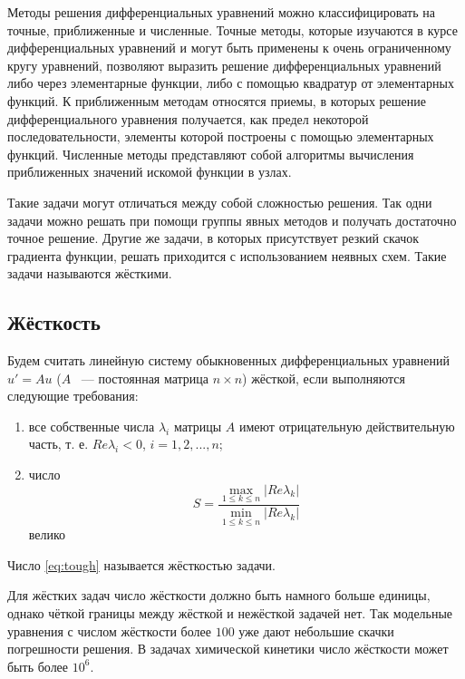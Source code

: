 Методы решения дифференциальных уравнений можно классифицировать на точные, приближенные и численные. Точные методы, которые изучаются
в курсе дифференциальных уравнений и могут быть применены к очень ограниченному кругу уравнений, позволяют выразить решение
дифференциальных уравнений либо через элементарные функции, либо с помощью квадратур от элементарных функций. К приближенным методам
относятся приемы, в которых решение дифференциального уравнения получается, как предел некоторой последовательности, элементы которой
построены с помощью элементарных функций. Численные методы представляют собой алгоритмы вычисления приближенных значений искомой
функции в узлах. %

Такие задачи могут отличаться между собой сложностью решения. Так одни задачи можно решать при помощи группы явных методов и получать
достаточно точное решение. Другие же задачи, в которых присутствует резкий скачок градиента функции, решать приходится с использованием
неявных схем. Такие задачи называются жёсткими.

\subsection{Жёсткость}

Будем считать линейную систему обыкновенных дифференциальных уравнений $u' = Au$ ($A$ ~--- постоянная матрица $n \times n$)
жёсткой, если выполняются следующие требования:

\begin{enumerate}
    \item все собственные числа $\lambda_i$ матрицы $A$ имеют отрицательную действительную часть, т. е. $Re\lambda_i < 0$, 
    $i = 1, 2, ..., n$;
    \item число
        \begin{equation}
            S = \dfrac{\max\limits_{1 \leq k \leq n}|Re\lambda_k|}{\min\limits_{1 \leq k \leq n}|Re\lambda_k|}
            \label{eq:tough}
        \end{equation}
        велико
\end{enumerate}

Число \ref{eq:tough} называется жёсткостью задачи.

Для жёстких задач число жёсткости должно быть намного больше единицы, однако чёткой границы между жёсткой и нежёсткой задачей нет. Так
модельные уравнения с числом жёсткости более $100$ уже дают небольшие скачки погрешности решения. В задачах химической кинетики число
жёсткости может быть более $10^6$.

